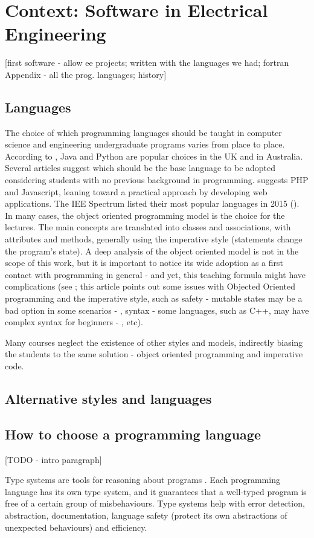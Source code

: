 \chapter{Context: Software in Electrical Engineering }

[first software - allow ee projects; written with the languages we had; fortran
Appendix - all the prog. languages; history]

\section{ Languages }

The choice of which programming languages should be taught in computer science and engineering undergraduate programs varies from place to place. According to \cite{mason2018language}, Java and Python are popular choices in the UK and in Australia. Several articles suggest which should be the base language to be adopted considering students with no previous background in programming. \cite{wang2006practical} suggests PHP and Javascript, leaning toward a practical approach by developing web applications. The IEE Spectrum listed their most popular languages in 2015 (\cite{cass20152015}). In many cases, the object oriented programming model \cite{rumbaugh1991object} is the choice for the lectures. The main concepts are translated into classes and associations, with attributes and methods, generally using the imperative style (statements change the program's state). A deep analysis of the object oriented model is not in the scope of this work, but it is important to notice its wide adoption as a first contact with programming in general - and yet, this teaching formula might have complications (see \cite{kolling1999problem}; this article points out some issues with Objected Oriented programming and the imperative style, such as safety - mutable states may be a bad option in some scenarios - , syntax - some languages, such as C++, may have complex syntax for beginners - , etc).


Many courses neglect the existence of other styles and models, indirectly biasing the students to the same solution - object oriented programming and imperative code.

\section{ Alternative styles and languages }

\section{ How to choose a programming language }

[TODO - intro paragraph]

Type systems are tools for reasoning about programs \cite{pierce2002types}. Each programming language has its own type system, and it guarantees that a well-typed program is free of a certain group of misbehaviours. Type systems help with error detection, abstraction, documentation, language safety (protect its own abstractions of unexpected behaviours) and efficiency.


